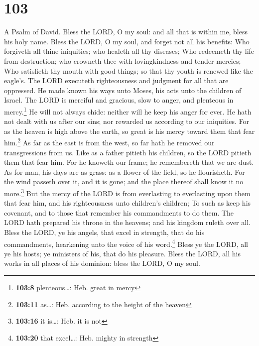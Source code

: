 \hypertarget{section-102}{%
\section{103}\label{section-102}}

A Psalm of David.  Bless the LORD, O my soul: and all that
is within me, bless his holy name.  Bless the LORD, O my
soul, and forget not all his benefits:  Who forgiveth all
thine iniquities; who healeth all thy diseases;  Who
redeemeth thy life from destruction; who crowneth thee with
lovingkindness and tender mercies;  Who satisfieth thy
mouth with good things; so that thy youth is renewed like the eagle's.
 The LORD executeth righteousness and judgment for all
that are oppressed.  He made known his ways unto Moses,
his acts unto the children of Israel.  The LORD is
merciful and gracious, slow to anger, and plenteous in mercy.\footnote{\textbf{103:8}
  plenteous\ldots: Heb. great in mercy}  He will not
always chide: neither will he keep his anger for ever. 
He hath not dealt with us after our sins; nor rewarded us according to
our iniquities.  For as the heaven is high above the
earth, so great is his mercy toward them that fear him.\footnote{\textbf{103:11}
  as\ldots: Heb. according to the height of the heaven} 
As far as the east is from the west, so far hath he removed our
transgressions from us.  Like as a father pitieth his
children, so the LORD pitieth them that fear him.  For he
knoweth our frame; he remembereth that we are dust.  As
for man, his days are as grass: as a flower of the field, so he
flourisheth.  For the wind passeth over it, and it is
gone; and the place thereof shall know it no more.\footnote{\textbf{103:16}
  it is\ldots: Heb. it is not}  But the mercy of the LORD
is from everlasting to everlasting upon them that fear him, and his
righteousness unto children's children;  To such as keep
his covenant, and to those that remember his commandments to do them.
 The LORD hath prepared his throne in the heavens; and
his kingdom ruleth over all.  Bless the LORD, ye his
angels, that excel in strength, that do his commandments, hearkening
unto the voice of his word.\footnote{\textbf{103:20} that excel\ldots:
  Heb. mighty in strength}  Bless ye the LORD, all ye his
hosts; ye ministers of his, that do his pleasure.  Bless
the LORD, all his works in all places of his dominion: bless the LORD, O
my soul.


